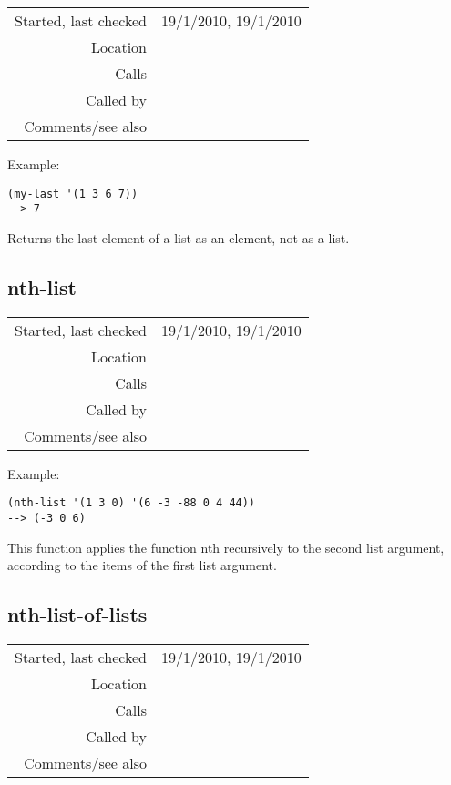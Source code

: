 \vspace{0.3cm}
\begin{tabular}{r|p{8cm}}
Started, last checked & 19/1/2010, 19/1/2010 \\
Location & \nameref{sec:list-processing} \\
Calls & \\
Called by & \\
Comments/see also & \nameref{fun:my-last-string}
\end{tabular}

\vspace{0.5cm}
\noindent Example:
\begin{verbatim}
(my-last '(1 3 6 7))
--> 7
\end{verbatim}

\noindent Returns the last element of a list as an
element, not as a list.


\subsection*{nth-list}\label{fun:nth-list}

\vspace{0.3cm}
\begin{tabular}{r|p{8cm}}
Started, last checked & 19/1/2010, 19/1/2010 \\
Location & \nameref{sec:list-processing} \\
Calls & \\
Called by & \\
Comments/see also & 
\end{tabular}

\vspace{0.5cm}
\noindent Example:
\begin{verbatim}
(nth-list '(1 3 0) '(6 -3 -88 0 4 44))
--> (-3 0 6)
\end{verbatim}

\noindent This function applies the function nth
recursively to the second list argument, according to
the items of the first list argument.


\subsection*{nth-list-of-lists}\label{fun:nth-list-of-lists}

\vspace{0.3cm}
\begin{tabular}{r|p{8cm}}
Started, last checked & 19/1/2010, 19/1/2010 \\
Location & \nameref{sec:list-processing} \\
Calls & \\
Called by & \\
Comments/see also & 
\end{tabular}

